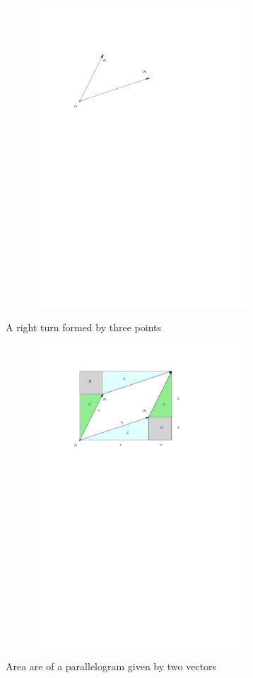 \begin{figure}[H]
    \centering
	\begin{subfigure}{.5\textwidth}
		\includegraphics[width=8cm]{figures/rightturn1.pdf}
		\caption{}
		\label{fig:rightturn_a}
	\end{subfigure}
	\caption{A right turn formed by three points}
	\begin{subfigure}{.7\textwidth}
		\includegraphics[width=8cm]{figures/rightturn2.pdf}
		\caption{}
		\label{fig:rightturn_b}
	\end{subfigure}
	\caption{Area are of a parallelogram given by two vectors}
\end{figure}

